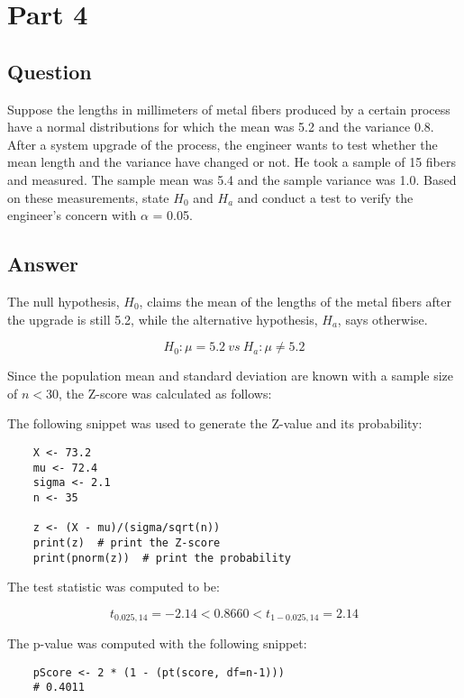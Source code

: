 \section{Part 4}
    \subsection{Question}
    Suppose the lengths in millimeters of metal fibers produced by a certain process have a normal distributions for which the mean was 5.2 and the variance 0.8. After a system upgrade of the process, the engineer wants to test whether the mean length and the variance have changed or not. He took a sample of 15 fibers and measured. The sample mean was 5.4 and the sample variance was 1.0. Based on these measurements, state $H_{0}$ and $H_{a}$ and conduct a test to verify the engineer's concern with $\alpha$ = 0.05.

    \subsection{Answer}
    The null hypothesis, $H_{0}$, claims the mean of the lengths of the metal fibers after the upgrade is still 5.2, while the alternative hypothesis, $H_{a}$, says otherwise.

        \[ H_{0}: \mu = 5.2 \ vs \ H_{a}: \mu \neq 5.2 \]

    Since the population mean and standard deviation are known with a sample size of $n < 30$, the Z-score was calculated as follows:

        \newline

    The following snippet was used to generate the Z-value and its probability:
\begin{lstlisting}
    X <- 73.2
    mu <- 72.4
    sigma <- 2.1
    n <- 35

    z <- (X - mu)/(sigma/sqrt(n))
    print(z)  # print the Z-score
    print(pnorm(z))  # print the probability
\end{lstlisting}

    The test statistic was computed to be:

    \begin{equation*}
        t_{0.025, 14}=-2.14 < 0.8660 < t_{1-0.025, 14}=2.14
    \end{equation*}

    The p-value was computed with the following snippet:
\begin{lstlisting}
    pScore <- 2 * (1 - (pt(score, df=n-1)))
    # 0.4011
\end{lstlisting}

